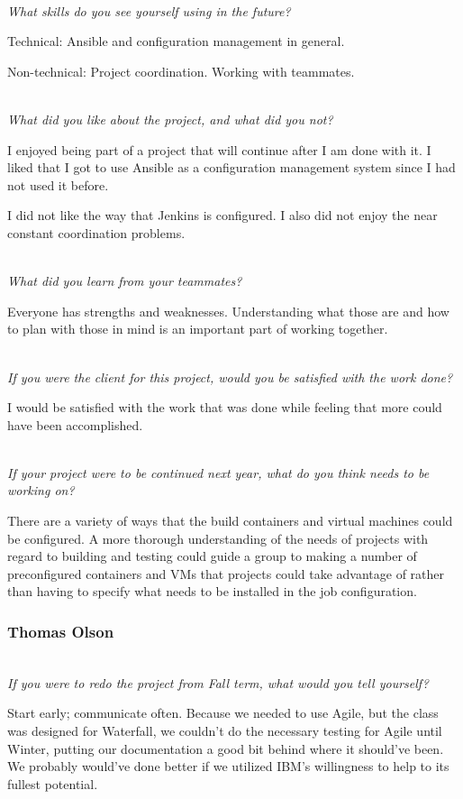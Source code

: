 \documentclass[10pt,letterpaper,onecolumn,draftclsnofoot]{IEEEtran}
\begin{document}
\textit{\\What skills do you see yourself using in the future?}

Technical: Ansible and configuration management in general.

Non-technical: Project coordination. Working with teammates.

\textit{\\What did you like about the project, and what did you not?}

I enjoyed being part of a project that will continue after I am done with it. I liked that I got to use Ansible as a configuration management system since I had not used it before.

I did not like the way that Jenkins is configured. I also did not enjoy the near constant coordination problems.

\textit{\\What did you learn from your teammates?}

Everyone has strengths and weaknesses. Understanding what those are and how to plan with those in mind is an important part of working together.

\textit{\\If you were the client for this project, would you be satisfied with the work done?}

I would be satisfied with the work that was done while feeling that more could have been accomplished.

\textit{\\If your project were to be continued next year, what do you think needs to be working on?}

There are a variety of ways that the build containers and virtual machines could be configured. A more thorough understanding of the needs of projects with regard to building and testing could guide a group to making a number of preconfigured containers and VMs that projects could take advantage of rather than having to specify what needs to be installed in the job configuration.\\

\subsubsection{Thomas Olson}
\textit{\\If you were to redo the project from Fall term, what would you tell yourself?}

Start early; communicate often. Because we needed to use Agile, but the class was designed for Waterfall, we couldn't do the necessary testing for Agile until Winter, putting our documentation a good bit behind where it should've been. We probably would've done better if we utilized IBM's willingness to help to its fullest potential.
\end{document}
